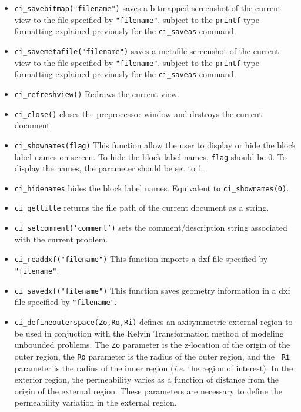 \begin{itemize}
\item \texttt{ci\_savebitmap("filename")} saves a bitmapped screenshot of the current
view to the file specified by \texttt{"filename"}, subject to the
\texttt{printf}-type formatting explained previously for the
\texttt{ci\_saveas} command.

\item \texttt{ci\_savemetafile("filename")} saves a metafile screenshot of the current
view to the file specified by \texttt{"filename"}, subject to the
\texttt{printf}-type formatting explained previously for the
\texttt{ci\_saveas} command.

\item \texttt{ci\_refreshview()} Redraws the current view.

\item \texttt{ci\_close()} closes the preprocessor window and
destroys the current document.

\item \texttt{ci\_shownames(flag)} This function allow the user to display or hide the
block label names on screen. To hide the block label names,
\texttt{flag} should be 0. To display the names, the parameter
should be set to 1.

\item{\tt ci\_hidenames} hides the block label names. Equivalent to {\tt ci\_shownames(0)}.

\item{\tt ci\_gettitle} returns the file path of the current document as a string.

\item{\tt ci\_setcomment('comment')} sets the comment/description string associated with the current problem.

\item{\tt ci\_readdxf("filename")} This function imports a dxf file specified by {\tt "filename"}.

\item{\tt ci\_savedxf("filename")} This function saves geometry information in a dxf file specified by {\tt "filename"}.

\item{\tt ci\_defineouterspace(Zo,Ro,Ri)} defines
an axisymmetric external region to be used in conjuction with the
Kelvin Transformation method of modeling unbounded problems.  The
{\tt Zo} parameter is the z-location of the origin of the outer region,
the {\tt Ro} parameter is the radius of the outer region, and the {\tt
Ri} parameter is the radius of the inner region ({\em i.e.} the region of
interest). In the exterior region, the permeability varies as a function of
distance from the origin of the external region.  These parameters
are necessary to define the permeability variation in the external
region.


\end{itemize}
